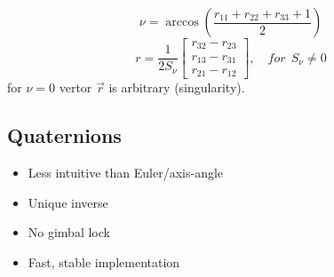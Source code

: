 \documentclass{article}
\begin{document}
$$ \nu = \arccos \left(
\frac{r_{11}+r_{22}+r_{33}+1}{2}
\right)
$$
$$ r = \frac{1}{2S_{\nu}}
\begin{bmatrix}
r_{32}-r_{23}\\
r_{13}-r_{31}\\
r_{21}-r_{12}
\end{bmatrix}
, \quad for \:\: S_{\nu}\ne0
$$
for $ \nu = 0$ vertor $\vec{r}{}$ is arbitrary (singularity).

\newpage
\subsection{Quaternions}

\begin{itemize}
    \item Less intuitive than Euler/axis-angle
    \item Unique inverse
    \item No gimbal lock
    \item Fast, stable implementation
\end{itemize}
\end{document}
